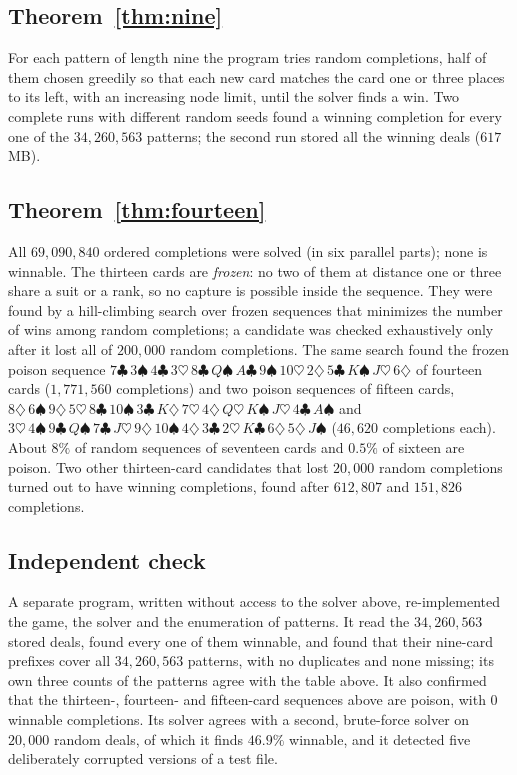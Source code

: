 \documentclass[11pt]{amsart}
\theoremstyle{remark}
\newcommand{\Sp}{\spadesuit}\newcommand{\He}{\heartsuit}\newcommand{\Di}{\diamondsuit}\newcommand{\Cl}{\clubsuit}
\begin{document}
\subsection*{Theorem~\ref{thm:nine}} For each pattern of length nine the program tries random completions, half of them
chosen greedily so that each new card matches the card one or three places to its left, with an increasing node limit,
until the solver finds a win. Two complete runs with different random seeds found a winning completion for every one
of the $34{,}260{,}563$ patterns; the second run stored all the winning deals ($617$ MB).

\subsection*{Theorem~\ref{thm:fourteen}} All $69{,}090{,}840$ ordered completions were solved (in six parallel parts);
none is winnable. The thirteen cards are \emph{frozen}: no two of them at distance one or three share a suit or a
rank, so no capture is possible inside the sequence. They were found by a hill-climbing search over frozen
sequences that minimizes the number of wins among random completions; a candidate was checked exhaustively only
after it lost all of $200{,}000$ random completions. The same search found the frozen poison sequence
$7\Cl\,3\Sp\,4\Cl\,3\He\,8\Cl\,Q\Sp\,A\Cl\,9\Sp\,10\He\,2\Di\,5\Cl\,K\Sp\,J\He\,6\Di$ of fourteen cards ($1{,}771{,}560$
completions) and two poison sequences of fifteen cards,
$8\Di\,6\Sp\,9\Di\,5\He\,8\Cl\,10\Sp\,3\Cl\,K\Di\,7\He\,4\Di\,Q\He\,K\Sp\,J\He\,4\Cl\,A\Sp$ and
$3\He\,4\Sp\,9\Cl\,Q\Sp\,7\Cl\,J\He\,9\Di\,10\Sp\,4\Di\,3\Cl\,2\He\,K\Cl\,6\Di\,5\Di\,J\Sp$ ($46{,}620$ completions each).
About $8\%$ of random sequences of seventeen cards and $0.5\%$ of sixteen are poison. Two other thirteen-card
candidates that lost $20{,}000$ random completions turned out to have winning completions, found after
$612{,}807$ and $151{,}826$ completions.

\subsection*{Independent check} A separate program, written without access to the solver above, re-implemented the
game, the solver and the enumeration of patterns. It read the $34{,}260{,}563$ stored deals, found every one of them
winnable, and found that their nine-card prefixes cover all $34{,}260{,}563$ patterns, with no duplicates and none
missing; its own three counts of the patterns agree with the table above. It also confirmed that the thirteen-,
fourteen- and fifteen-card sequences above are poison, with $0$ winnable completions. Its solver agrees with a
second, brute-force solver on $20{,}000$ random deals, of which it finds $46.9\%$ winnable, and it detected five
deliberately corrupted versions of a test file.
\end{document}
